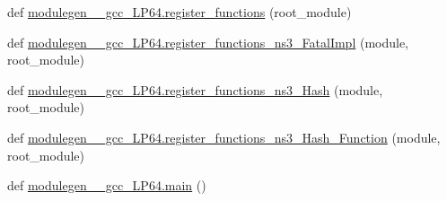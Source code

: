 \begin{DoxyCompactItemize}
\item 
def \hyperlink{namespacemodulegen____gcc__LP64_aec4a5f753ed5fb80e971fb72341c9052}{modulegen\+\_\+\+\_\+gcc\+\_\+\+L\+P64.\+register\+\_\+functions} (root\+\_\+module)
\item 
def \hyperlink{namespacemodulegen____gcc__LP64_a50e31627c725d62dd753bad9b750a7a2}{modulegen\+\_\+\+\_\+gcc\+\_\+\+L\+P64.\+register\+\_\+functions\+\_\+ns3\+\_\+\+Fatal\+Impl} (module, root\+\_\+module)
\item 
def \hyperlink{namespacemodulegen____gcc__LP64_aaccaa7a88652c7cf1cbe4bae23dfd70f}{modulegen\+\_\+\+\_\+gcc\+\_\+\+L\+P64.\+register\+\_\+functions\+\_\+ns3\+\_\+\+Hash} (module, root\+\_\+module)
\item 
def \hyperlink{namespacemodulegen____gcc__LP64_ac5702d84dcfdab4237af2580ad57e6cd}{modulegen\+\_\+\+\_\+gcc\+\_\+\+L\+P64.\+register\+\_\+functions\+\_\+ns3\+\_\+\+Hash\+\_\+\+Function} (module, root\+\_\+module)
\item 
def \hyperlink{namespacemodulegen____gcc__LP64_a78c8b268d5fecc4d52d220f8954d0345}{modulegen\+\_\+\+\_\+gcc\+\_\+\+L\+P64.\+main} ()
\end{DoxyCompactItemize}
